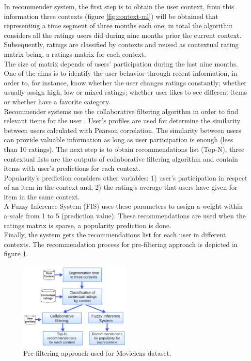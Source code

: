 In recommender system, the first step is to obtain the user context, 
from this information three contexts
(figure \ref{fig:context-ml}) will be obtained that representing a
time segment of three months each one, in total the algorithm
considers all the ratings users did during nine months prior the
current context. Subsequently, ratings are classified by contexts and
reused as contextual rating matrix being, a ratings matrix for each
context. \\The size of matrix depends of users' participation during
the last nine months. One of the aims is to identify the user behavior
through recent information, in order to, for instance, know whether
the user changes ratings constantly; whether usually assign high, low
or mixed ratings; whether user likes to see different items or whether
have a favorite category.\\  Recommender systems use the collaborative
filtering algorithm in order to find relevant items for the user
\cite{ramirez2013restaurant}. User's profiles are used for determine
the similarity between users calculated with Pearson correlation. The
similarity between users can provide valuable information as long as
user participation is enough (less than 10 ratings). The next step is
to obtain recommendations list (Top-N), three contextual lists are the
outputs of collaborative filtering algorithm and contain items with
user's predictions for each context.\\Popularity's prediction
considers other variables: 1) user’s participation in respect of an
item in the context and, 2) the rating's average that users have given
for item in the same context. \\A Fuzzy Inference System (FIS) uses
these parameters to assign a weight within a scale from 1 to 5
(prediction value). These recommendations are used when the ratings
matrix is sparse, a popularity prediction is done. \\Finally, the
system gets the recommendations list for each user in different
contexts. The recommendation process for pre-filtering approach
 is depicted in figure \ref{fig:archi-ml}.
\begin{figure}
\captionsetup{justification=centering,margin=2cm,font=footnotesize}
\centering
\setlength\fboxsep{0pt}
\includegraphics[width=0.50\textwidth]{img/archi-ml.png}
\caption{Pre-filtering approach used for Movielens dataset.}
\label{fig:archi-ml}     
\end{figure}
